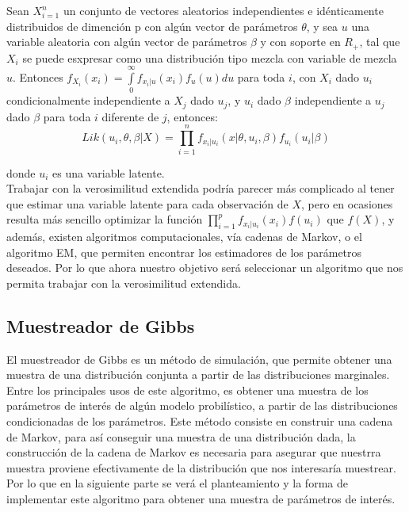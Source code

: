 \documentclass[11pt]{book}
\begin{document}
	Sean ${X}_{i=1}^{n}$ un conjunto de vectores aleatorios independientes e idénticamente distribuidos de dimención p con algún vector de parámetros $\theta$, y sea $u$ una variable aleatoria con algún vector de parámetros $\beta$ y con soporte en $R_{+}$, tal que $X_{i}$ se puede esxpresar como una distribución tipo mezcla con variable de mezcla $u$. Entonces  $f_{X_{i}}(x_{i})=\underset{0}{\overset{\infty }{\int }}f_{x_{i}|u}(x_{i})f_{u}(u)du$ para toda $i$, con $X_{i}$ dado $u_{i}$ condicionalmente independiente a $X_{j}$ dado $u_{j}$, y $ u_{i}$ dado $\beta$ independiente a $u_{j}$ dado $\beta$ para toda $i$ diferente de $j$, entonces:\\
	\begin{equation*}
	Lik(u_{i},\theta,\beta |X)=\prod_{i=1}^{n}f_{x_{i}|u_{i}}(x|\theta, u_{i},\beta)f_{u_{i}}(u_{i}|\beta)
	\end{equation*}
	
	
	donde $u_{i}$ es una variable latente.\\
	
	Trabajar con la verosimilitud extendida podría parecer más complicado al tener que estimar una variable latente para cada observación de $X$, pero en ocasiones resulta más sencillo optimizar la función $\prod_{i=1}^{p}f_{x_{i}|u_{i}}(x_{i})f(u_{i})$ que $f(X)$, y además, existen algoritmos computacionales, vía cadenas de Markov, o el algoritmo EM, que permiten encontrar los estimadores de los parámetros deseados. Por lo que ahora nuestro objetivo será seleccionar un algoritmo que nos permita trabajar con la verosimilitud extendida.



\subsection*{Muestreador de Gibbs}

El muestreador de Gibbs es un método de simulación, que permite obtener una muestra de una distribución conjunta a partir de las distribuciones marginales. Entre los principales usos de este algoritmo, es obtener una muestra de los parámetros de interés de algún modelo probilístico, a partir de las distribuciones condicionadas de los parámetros. Este método consiste en construir una cadena de Markov, para así conseguir una muestra de una distribución dada, la construcción de la cadena de Markov es necesaria para asegurar que nuestrra muestra proviene efectivamente de la distribución que nos interesaría muestrear. Por lo que en la siguiente parte se verá el planteamiento y la forma de implementar este algoritmo para obtener una muestra de parámetros de interés. \\
\end{document}
